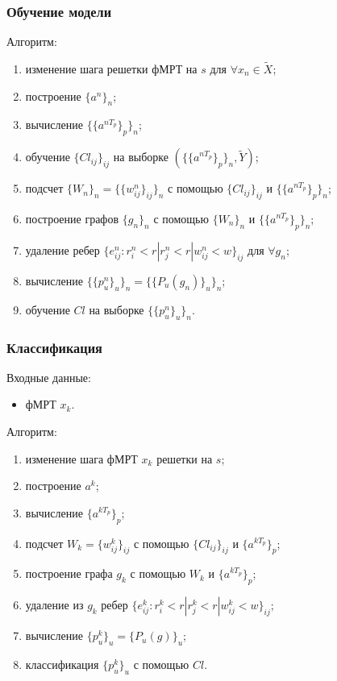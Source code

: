 \documentclass{beamer}
\begin{document}
	\begin{frame} 
		\frametitle{Обучение модели}
		Алгоритм: 
		\begin{enumerate}
			\item изменение шага решетки фМРТ на $s$ для $\forall x_n \in \widetilde{X}$;
			\item построение $\{a^n\}_n$;
			\item вычисление $\{\{a^{nT_p}\}_{p}\}_n$;
			\item обучение  $\{Cl_{ij}\}_{ij}$ на выборке $(\{\{a^{nT_p}\}_{p}\}_n, \widetilde{Y})$;
			\item подсчет $\{W_n\}_n = \{\{w_{ij}^n\}_{ij}\}_n$ с помощью $\{Cl_{ij}\}_{ij}$ и $\{\{a^{nT_p}\}_{p}\}_n$;
			\item построение графов $\{g_n\}_n$ с помощью $\{W_n\}_n$ и $\{\{a^{nT_p}\}_{p}\}_n$;
			\item удаление ребер $\{e_{ij}^n : r_i^n < r | r_j^n < r | w_{ij}^n < w\}_{ij}$  для $\forall g_n$;
			\item вычисление $\{\{p^n_u\}_u\}_n = \{\{P_u(g_n)\}_u\}_n$;
			\item обучение $Cl$ на выборке $\{\{p^n_u\}_u\}_n$.
		\end{enumerate}
	\end{frame}

	\begin{frame} 
		\frametitle{Классификация}
		Входные данные:
		\begin{itemize}
			\item фМРТ $x_k$.
		\end{itemize}
		Алгоритм: 
		\begin{enumerate}
			\item изменение шага фМРТ $x_k$ решетки на $s$;
			\item построение $a^k$;
			\item вычисление $\{a^{kT_p}\}_{p}$;
			\item подсчет $W_k = \{w^k_{ij}\}_{ij}$ с помощью $\{Cl_{ij}\}_{ij}$ и $\{a^{kT_p}\}_{p}$;
			\item построение графа $g_k$ с помощью $W_k$ и $\{a^{kT_p}\}_{p}$;
			\item удаление из $g_k$ ребер $\{e^k_{ij} : r^k_i < r | r^k_j < r | w^k_{ij} < w\}_{ij}$;
			\item вычисление $\{p^k_u\}_u = \{P_u(g)\}_u$;
			\item классификация $\{p^k_u\}_u$ с помощью $Cl$.
		\end{enumerate}
	\end{frame}
	
\end{document}
